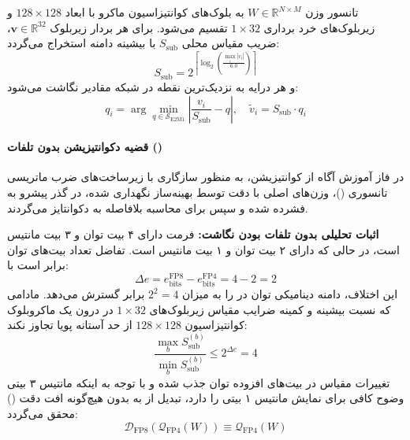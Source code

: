 تانسور وزن $W \in \mathbb{R}^{N \times M}$ به بلوک‌های کوانتیزاسیون ماکرو با ابعاد $128 \times 128$ و زیربلوک‌های خرد برداری $1 \times 32$ تقسیم می‌شود. برای هر بردار زیربلوک $\mathbf{v} \in \mathbb{R}^{32}$، ضریب مقیاس محلی $S_{\text{sub}}$ با بیشینه دامنه استخراج می‌گردد:
\begin{equation}
    S_{\text{sub}} = 2^{\left\lceil \log_2 \left( \frac{\max_{i} |v_i|}{6.0} \right) \right\rceil}
\end{equation}
و هر درایه به نزدیک‌ترین نقطه در شبکه مقادیر  نگاشت می‌شود:
\begin{equation}
    q_i = \arg\min_{q \in \mathcal{S}_{\text{E2M1}}} \left| \frac{v_i}{S_{\text{sub}}} - q \right|, \quad \tilde{v}_i = S_{\text{sub}} \cdot q_i
\end{equation}

\paragraph*{قضیه دکوانتیزیشن بدون تلفات ()}
در فاز آموزش آگاه از کوانتیزیشن، به منظور سازگاری با زیرساخت‌های ضرب ماتریسی تانسوری ()، وزن‌های اصلی با دقت  توسط بهینه‌ساز نگهداری شده، در گذر پیشرو به  فشرده شده و سپس برای محاسبه بلافاصله به  دکوانتایز می‌گردند.

\noindent\textbf{اثبات تحلیلی بدون تلفات بودن نگاشت:} فرمت  دارای ۴ بیت توان و ۳ بیت مانتیس است، در حالی که  دارای ۲ بیت توان و ۱ بیت مانتیس است. تفاضل تعداد بیت‌های توان برابر است با:
\begin{equation}
    \Delta e = e_{\text{bits}}^{\text{FP8}} - e_{\text{bits}}^{\text{FP4}} = 4 - 2 = 2
\end{equation}
این اختلاف، دامنه دینامیکی توان در  را به میزان $2^2 = 4$ برابر گسترش می‌دهد. مادامی که نسبت بیشینه و کمینه ضرایب مقیاس زیربلوک‌های $1 \times 32$ در درون یک ماکروبلوک کوانتیزاسیون $128 \times 128$ از حد آستانه پویا تجاوز نکند:
\begin{equation}
    \frac{\max_{b} S_{\text{sub}}^{(b)}}{\min_{b} S_{\text{sub}}^{(b)}} \le 2^{\Delta e} = 4
\end{equation}
تغییرات مقیاس در بیت‌های افزوده توان  جذب شده و با توجه به اینکه مانتیس ۳ بیتی  وضوح کافی برای نمایش مانتیس ۱ بیتی  را دارد، تبدیل از  به  بدون هیچ‌گونه افت دقت () محقق می‌گردد:
\begin{equation}
    \mathcal{D}_{\text{FP8}}(\mathcal{Q}_{\text{FP4}}(W)) \equiv \mathcal{Q}_{\text{FP4}}(W)
\end{equation}

